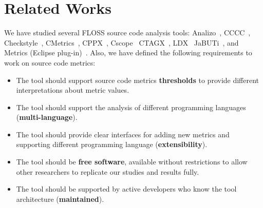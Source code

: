 \section{Related Works}
\label{sec:related_works}


We have studied several FLOSS source code analysis tools:
%
Analizo~\cite{analizo},
CCCC~\cite{cccc},
Checkstyle~\cite{checkstyle},
CMetrics~\cite{cmetrics},
CPPX~\cite{hassan2005},
Cscope~\cite{cscope}
CTAGX~\cite{hassan2005},
LDX~\cite{hassan2005}
JaBUTi~\cite{jabuti},
and Metrics (Eclipse plug-in)~\cite{eclipsemetrics}.
%
Also, we have defined the following requirements to work on source
code metrics:

\begin{itemize}

  \item The tool should support source code metrics \textbf{thresholds} to
provide different interpretations about metric values.

  \item The tool should support the analysis of different programming languages
(\textbf{multi-language}).

  \item The tool should provide clear interfaces for adding new metrics and supporting
different programming language (\textbf{extensibility}).

  \item The tool should be \textbf{free software}, available without
restrictions to allow other researchers to replicate our studies and results
fully.

  \item The tool should be supported by active developers who know the tool
architecture (\textbf{maintained}).
 
\end{itemize}


